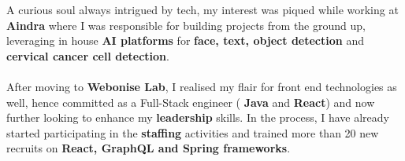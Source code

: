 \documentclass[10pt,a4paper,ragged2e,withhyper]{altacv}
\begin{document}
\begin{paracol}{2}

A curious soul always intrigued by tech, my interest was piqued while working at \textbf{Aindra} where I was responsible for building projects from the ground up, leveraging in house \textbf{AI platforms} for \textbf{face, text, object detection} and \textbf{cervical cancer cell detection}.\\~\\

After moving to \textbf{Webonise Lab}, I realised my flair for front end technologies as well, hence committed as a Full-Stack engineer ( \textbf{Java} and \textbf{React}) and now further looking to enhance my \textbf{leadership} skills. In the process, I have already started participating in the \textbf{staffing} activities and trained more than 20 new recruits on \textbf{React, GraphQL and Spring frameworks}.









\\
\\
\divider\smallskip

\\




\end{paracol}
\end{document}
